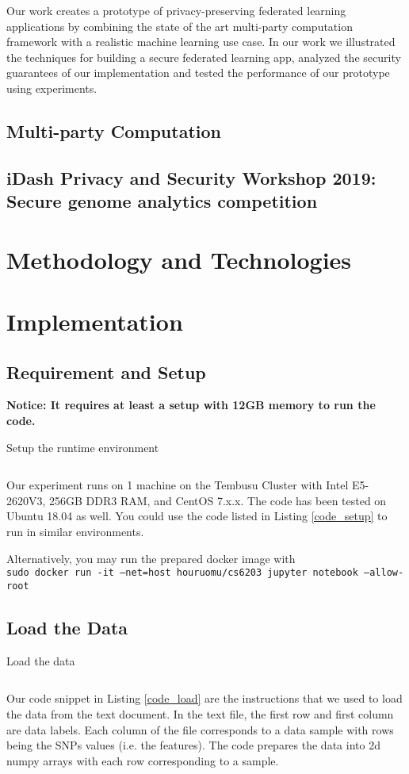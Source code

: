 \documentclass[a4paper,12pt]{article}
\begin{document}
Our work creates a prototype of privacy-preserving federated learning applications by combining the state of the art multi-party computation framework with a realistic machine learning use case. In our work we illustrated the techniques for building a secure federated learning app, analyzed the security guarantees of our implementation and tested the performance of our prototype using experiments.

\subsection{Multi-party Computation}

\subsection{iDash Privacy and Security Workshop 2019: Secure genome analytics competition}

\section{Methodology and Technologies}

\section{Implementation}
\subsection{Requirement and Setup}
\textbf{Notice: It requires at least a setup with 12GB memory to run the code.}

\begin{listing}[H]
	\caption{Setup the runtime environment}
	\inputminted[frame=single,framesep=10pt,linenos]{bash}{1_prep.sh}
	\label{code_setup}
\end{listing}

Our experiment runs on 1 machine on the Tembusu Cluster with Intel E5-2620V3, 256GB DDR3 RAM, and CentOS 7.x.x. The code has been tested on Ubuntu 18.04 as well. You could use the code listed in Listing \ref{code_setup} to run in similar environments.  

Alternatively, you may run the prepared docker image with\\
\texttt{sudo docker run -it --net=host houruomu/cs6203 jupyter notebook --allow-root}

\subsection{Load the Data}
\begin{listing}[H]
	\caption{Load the data}
	\inputminted[frame=single,framesep=10pt,linenos]{python3}{load_data.py}
	\label{code_load}
\end{listing}
Our code snippet in Listing \ref{code_load} are the instructions that we used to load the data from the text document. In the text file, the first row and first column are data labels. Each column of the file corresponds to a data sample with rows being the SNPs values (i.e. the features). The code prepares the data into 2d numpy arrays with each row corresponding to a sample.
\end{document}
